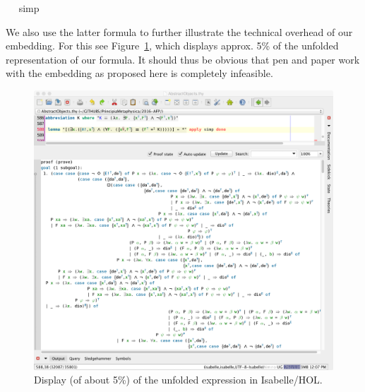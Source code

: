 \begin{isabellebody}
\isadelimproof
\ %
\endisadelimproof
%
\isatagproof
{}\isamarkupfalse%
\ simp\ \isamarkupfalse%
%
\endisatagproof
{\isafoldproof}%
%
\isadelimproof
%
\endisadelimproof
%
\begin{isamarkuptext}%
We also use the latter formula to further illustrate the technical overhead of our embedding. 
 For this see Figure~\ref{large}, which displays approx. 5\% of the unfolded representation of our 
 formula. It should thus be obvious that pen and paper work with the embedding as proposed here 
 is completely infeasible. 
   \begin{figure}[t] \centering
  \includegraphics[width=.9\textwidth]{LargeTerm.png}
  \caption{Display (of about 5\%) of the unfolded expression  
 in Isabelle/HOL. \label{large}} 
  \end{figure}%
\end{isamarkuptext}%

\end{isabellebody}
